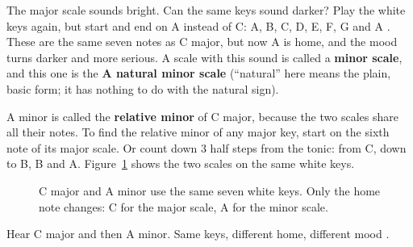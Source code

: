 The major scale sounds bright. Can the same keys sound darker? Play the white keys again, but start and end on A instead of C: A, B, C, D, E, F, G and A . These are the same seven notes as C major, but now A is home, and the mood turns darker and more serious. A scale with this sound is called a \textbf{minor scale}, and this one is the \textbf{A natural minor scale} (``natural'' here means the plain, basic form; it has nothing to do with the natural sign).

A minor is called the \textbf{relative minor} of C major, because the two scales share all their notes. To find the relative minor of any major key, start on the sixth note of its major scale. Or count down 3 half steps from the tonic: from C, down to B, B\fl{} and A. Figure~\ref{fig:relative-minor} shows the two scales on the same white keys.

\begin{figure}[htbp]
\centering
{}
\caption{C major and A minor use the same seven white keys. Only the home note changes: C for the major scale, A for the minor scale.}
\label{fig:relative-minor}
\end{figure}

Hear C major and then A minor. Same keys, different home, different mood .

